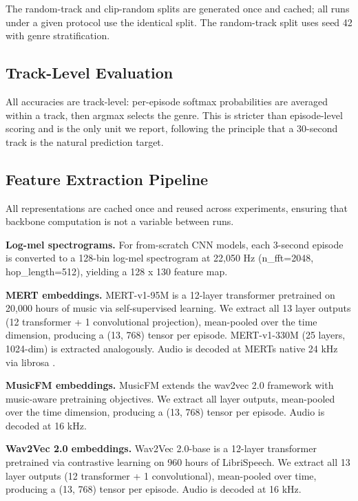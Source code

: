 \documentclass[conference]{IEEEtran}
\begin{document}
The random-track and clip-random splits are generated once and cached;
all runs under a given protocol use the identical split. The
random-track split uses seed 42 with genre stratification.

\subsection{Track-Level Evaluation}\label{c.-track-level-evaluation}

All accuracies are track-level: per-episode softmax probabilities are
averaged within a track, then argmax selects the genre. This is stricter
than episode-level scoring and is the only unit we report, following the
principle that a 30-second track is the natural prediction target.

\subsection{Feature Extraction
Pipeline}\label{d.-feature-extraction-pipeline}

All representations are cached once and reused across experiments,
ensuring that backbone computation is not a variable between runs.

\textbf{Log-mel spectrograms.} For from-scratch CNN models, each
3-second episode is converted to a 128-bin log-mel spectrogram at 22,050
Hz (n\_fft=2048, hop\_length=512), yielding a 128 x 130 feature map.

\textbf{MERT embeddings.} MERT-v1-95M \citep{li2023mert} is a 12-layer
transformer pretrained on 20,000 hours of music via self-supervised
learning. We extract all 13 layer outputs (12 transformer + 1
convolutional projection), mean-pooled over the time dimension,
producing a (13, 768) tensor per episode. MERT-v1-330M (25 layers,
1024-dim) is extracted analogously. Audio is decoded at
MERT\textquotesingle s native 24 kHz via librosa
\citep{mcfee2015librosa}.

\textbf{MusicFM embeddings.} MusicFM \citep{li2024musicfm} extends the
wav2vec 2.0 framework with music-aware pretraining objectives. We
extract all layer outputs, mean-pooled over the time dimension,
producing a (13, 768) tensor per episode. Audio is decoded at 16 kHz.

\textbf{Wav2Vec 2.0 embeddings.} Wav2Vec 2.0-base
\citep{baevski2020wav2vec} is a 12-layer transformer pretrained via
contrastive learning on 960 hours of LibriSpeech. We extract all 13
layer outputs (12 transformer + 1 convolutional), mean-pooled over time,
producing a (13, 768) tensor per episode. Audio is decoded at 16 kHz.
\end{document}
